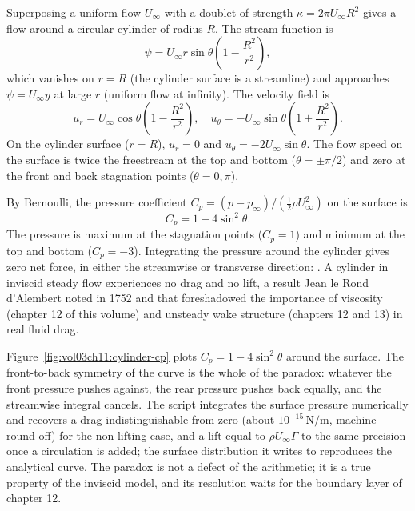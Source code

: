 Superposing a uniform flow $U_\infty$ with a doublet of strength
$\kappa = 2\pi U_\infty R^2$ gives a flow around a circular
cylinder of radius $R$. The stream function is
\[
\psi = U_\infty r \sin\theta\left(1 - \frac{R^2}{r^2}\right),
\]
which vanishes on $r = R$ (the cylinder surface is a streamline)
and approaches $\psi = U_\infty y$ at large $r$ (uniform flow at
infinity). The velocity field is
\[
u_r = U_\infty \cos\theta\left(1 - \frac{R^2}{r^2}\right), \quad
u_\theta = -U_\infty \sin\theta\left(1 + \frac{R^2}{r^2}\right).
\]
On the cylinder surface ($r = R$), $u_r = 0$ and
$u_\theta = -2 U_\infty \sin\theta$. The flow speed on the surface
is twice the freestream at the top and bottom ($\theta = \pm\pi/2$)
and zero at the front and back stagnation points ($\theta = 0,
\pi$).

By Bernoulli, the pressure coefficient
$C_p = (p - p_\infty)/(\tfrac{1}{2}\rho U_\infty^2)$ on the
surface is
\[
C_p = 1 - 4\sin^2\theta.
\]
The pressure is maximum at the stagnation points ($C_p = 1$) and
minimum at the top and bottom ($C_p = -3$). Integrating the
pressure around the cylinder gives zero net force, in either the
streamwise or transverse direction: .
A cylinder in inviscid steady flow experiences no drag and no
lift, a result Jean le Rond d'Alembert noted in 1752 and that
foreshadowed the importance of viscosity (chapter 12 of this
volume) and unsteady wake structure (chapters 12 and 13) in real
fluid drag.



Figure~\ref{fig:vol03ch11:cylinder-cp} plots $C_p = 1 - 4\sin^2\theta$
around the surface. The front-to-back symmetry of the curve is the
whole of the paradox: whatever the front pressure pushes against, the
rear pressure pushes back equally, and the streamwise integral
cancels. The script  integrates the
surface pressure numerically and recovers a drag indistinguishable
from zero (about $10^{-15}\,\si{\newton\per\meter}$, machine round-off)
for the non-lifting case, and a lift equal to $\rho U_\infty\Gamma$ to
the same precision once a circulation is added; the surface
distribution it writes to  reproduces the
analytical curve. The paradox is not a defect of the arithmetic; it
is a true property of the inviscid model, and its resolution waits for
the boundary layer of chapter 12.

